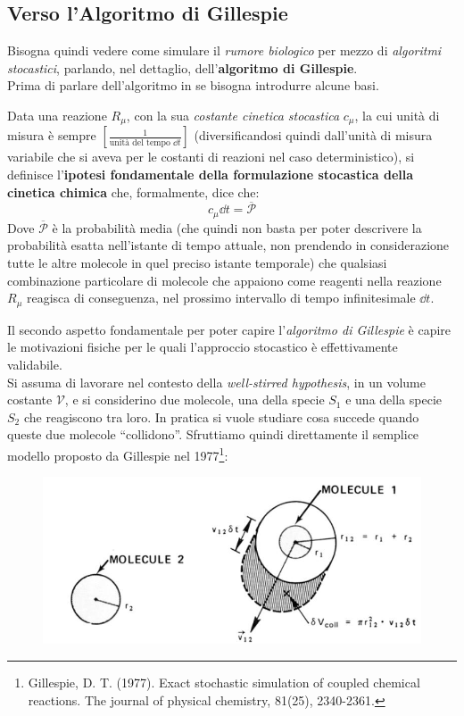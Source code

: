 \documentclass[a4paper,12pt, oneside]{book}
\begin{document}
\subsection{Verso l'Algoritmo di Gillespie}
Bisogna quindi vedere come simulare il \textit{rumore biologico} per mezzo di
\textit{algoritmi stocastici}, parlando, nel dettaglio, dell'\textbf{algoritmo
  di Gillespie}.\\
Prima di parlare dell'algoritmo in se bisogna introdurre alcune basi.
\begin{definizione}
  Data una reazione $R_\mu$, con la sua \textit{costante cinetica
    stocastica} $c_\mu$, la cui unità di misura è sempre
  $\left[\frac{1}{\mbox{unità del tempo }\dd{t}}\right]$ (diversificandosi
  quindi dall'unità di misura 
  variabile che si aveva per le costanti di reazioni nel caso deterministico),
  si definisce l'\textbf{ipotesi fondamentale della 
    formulazione stocastica della cinetica chimica} che, formalmente, dice che:
  \[c_\mu\dd{t}=\overline{\mathcal{P}}\]
  Dove $\overline{\mathcal{P}}$ è la probabilità media (che quindi non basta per
  poter descrivere la probabilità esatta nell'istante di tempo attuale, non
  prendendo in considerazione tutte le altre molecole in quel preciso istante
  temporale) che 
  qualsiasi 
  combinazione particolare di molecole che appaiono come reagenti nella reazione
  $R_\mu$ reagisca di conseguenza, nel prossimo intervallo di tempo
  infinitesimale $\dd{t}$.
\end{definizione}
Il secondo aspetto fondamentale per poter capire l'\textit{algoritmo di
  Gillespie} è capire le motivazioni fisiche per le quali l'approccio stocastico
è effettivamente validabile. \\
Si assuma di lavorare nel contesto della \textit{well-stirred hypothesis}, in un
volume costante $\mathcal{V}$, e si
considerino due molecole, una della specie $S_1$ e una della specie $S_2$ che
reagiscono tra loro. In pratica si vuole studiare cosa succede quando queste due
molecole ``collidono''. Sfruttiamo quindi direttamente il semplice modello
proposto da Gillespie nel 1977\footnote{Gillespie, D. T. (1977). Exact
  stochastic simulation of coupled chemical reactions. The journal of physical
  chemistry, 81(25), 2340-2361.}:
\begin{figure}[H]
  \centering
  \includegraphics[scale = 0.25]{img/gill1.jpg}
\end{figure}
\end{document}
